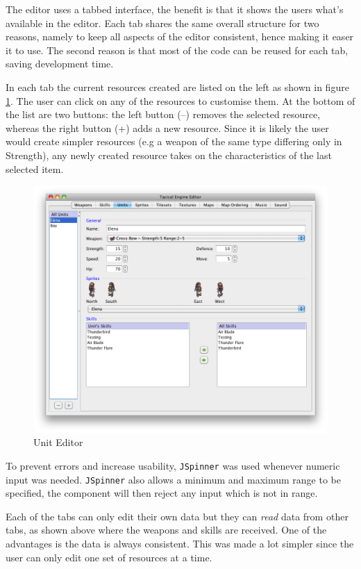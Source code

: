 The editor uses a tabbed interface, the benefit is that it shows the users what's available in the editor. Each tab shares the same overall structure for two reasons, namely to keep all aspects of the editor consistent, hence making it easer it to use. The second reason is that most of the code can be reused for each tab, saving development time. 

In each tab the current resources created are listed on the left as shown in figure \ref{fig:figures_editor_Units}. The user can click on any of the resources to customise them. At the bottom of the list are two buttons: the left button (--) removes the selected resource, whereas the right button (+) adds a new resource. Since it is likely the user would create simpler resources (e.g  a weapon of the same type differing only in Strength), any newly created resource takes on the characteristics of the last selected item.

\begin{figure}[htbp]
	\centering
		\includegraphics[width=\textwidth]{figures/editor/Units.png}
	\caption{Unit Editor}
	\label{fig:figures_editor_Units}
\end{figure}

To prevent errors and increase usability,  \texttt{JSpinner} was used whenever numeric input was needed. \texttt{JSpinner} also allows a minimum and maximum range to be specified,  the component will then reject any input which is not in range.

Each of the tabs can only edit their own data but they can \emph{read} data from other tabs, as shown above where the weapons and skills are received. One of the advantages is the data is always consistent. This was made a lot simpler since the user can only edit one set of resources at a time.

